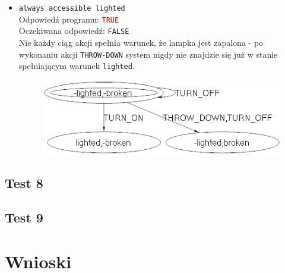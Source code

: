 \documentclass{article}
\begin{document}
\begin{itemize}
	\item {\large\texttt{always accessible lighted}}\\
	Odpowiedź programu: \textcolor{red}{\texttt{TRUE}}\\
	Oczekiwana odpowiedź: \texttt{FALSE}\\
    Nie każdy ciąg akcji spełnia warunek, że lampka jest zapalona - po wykonaniu akcji \texttt{THROW-DOWN} system nigdy nie znajdzie się już w stanie spełniającym warunek \texttt{lighted}.
    \begin{figure}[H]
    \centering
    \includegraphics[scale=0.5]{7_3}
    \end{figure}

\end{itemize}


\newpage
\subsection{Test 8}
\newpage
\subsection{Test 9}
\newpage
\section{Wnioski}
\end{document}
